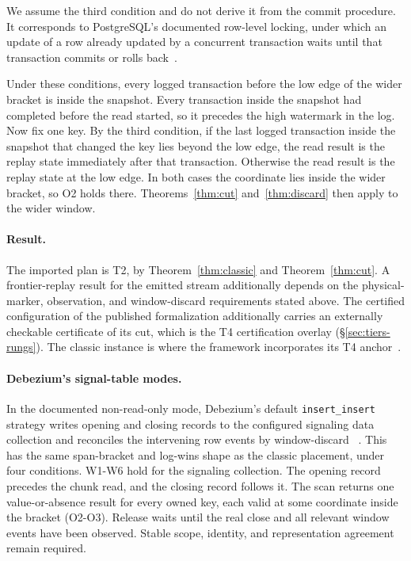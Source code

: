 \documentclass[sigconf,nonacm,10pt]{acmart}
\theoremstyle{plain}
\theoremstyle{definition}
\begin{document}
We assume the third condition and do not derive it from the commit
procedure. It corresponds to PostgreSQL's documented row-level locking,
under which an update of a row already updated by a concurrent transaction
waits until that transaction commits or rolls
back~\cite{postgres_transaction_iso}.

Under these conditions, every logged transaction before the low edge of
the wider bracket is inside the snapshot. Every transaction inside the
snapshot had completed before the read started, so it precedes the
high watermark in the log. Now fix one key. By the third condition, if
the last logged transaction inside the snapshot that changed the key lies beyond
the low edge, the read result is the replay state immediately after that
transaction.
Otherwise the read result is the replay state
at the low edge. In both cases the coordinate lies inside the wider
bracket, so O2 holds there. Theorems~\ref{thm:cut} and~\ref{thm:discard} then apply
to the wider window.

\paragraph{Result.} The imported plan is T2, by
Theorem~\ref{thm:classic} and Theorem~\ref{thm:cut}. A
frontier-replay result for the emitted stream additionally depends on the physical-marker,
observation, and window-discard requirements stated above.
The certified configuration of the
published formalization additionally carries an externally
checkable certificate of its cut, which is the T4 certification
overlay (\S\ref{sec:tiers-rungs}). The classic instance is where the
framework incorporates its T4 anchor~\cite{andreakis2026virtualcuts}.

\paragraph{Debezium's signal-table modes.}
In the documented non-read-only mode, Debezium's default
\texttt{insert\_insert} strategy writes opening and closing records to
the configured signaling data collection and reconciles the intervening
row events by window-discard
~\cite{debezium_signalling,debezium_mysql_connector}. This has the same
span-bracket and log-wins shape as the classic placement, under four
conditions. W1-W6 hold for the signaling collection. The opening
record precedes the chunk read, and the closing record follows it. The
scan returns one value-or-absence result for every owned key, each valid
at some coordinate inside the bracket (O2-O3). Release waits until the
real close and all relevant window events have been observed. Stable scope,
identity, and representation agreement remain required.
\end{document}
